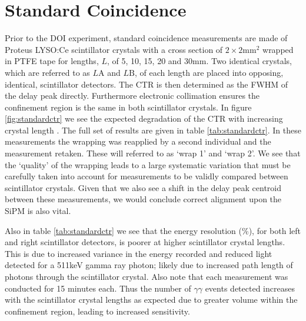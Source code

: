 \section{Standard Coincidence}
\label{sec:standardctr}
Prior to the DOI experiment, standard coincidence measurements are made of Proteus LYSO:Ce scintillator crystals with a cross section of $2\times2$mm$^2$ wrapped in PTFE tape for lengths, $L$, of 5, 10, 15, 20 and 30mm. Two identical crystals, which are referred to as $L\text{A}$ and $L\text{B}$, of each length are placed into opposing, identical, scintillator detectors. The CTR is then determined as the FWHM of the delay peak directly. Furthermore electronic collimation ensures the confinement region is the same in both scintillator crystals. In figure \ref{fig:standardctr} we see the expected degradation of the CTR with increasing crystal length \cite{r_Paganoni_Pauwels_et_al__2011}\cite{Wiener_Kaul_Surti_Karp_2010}\cite{Choong_2009}\cite{Gola_Piemonte_Tarolli_2013}\cite{o_Pro_Serra_Tarolli_Zorzi_2011}. The full set of results are given in table \ref{tab:standardctr}. In these measurements the wrapping was reapplied by a second individual and the measurement retaken. These will referred to as `wrap 1' and `wrap 2'. We see that the `quality' of the wrapping leads to a large systematic variation that must be carefully taken into account for measurements to be validly compared between scintillator crystals. Given that we also see a shift in the delay peak centroid between these measurements, we would conclude correct alignment upon the SiPM is also vital. 

Also in table \ref{tab:standardctr} we see that the energy resolution (\%), for both left and right scintillator detectors, is poorer at higher scintillator crystal lengths. This is due to increased variance in the energy recorded and reduced light detected for a 511keV gamma ray photon; likely due to increased path length of photons through the scintillator crystal. Also note that each measurement was conducted for 15 minutes each. Thus the number of $\gamma\gamma$ events detected increases with the scintillator crystal lengths as expected  due to greater volume within the confinement region, leading to increased sensitivity.
